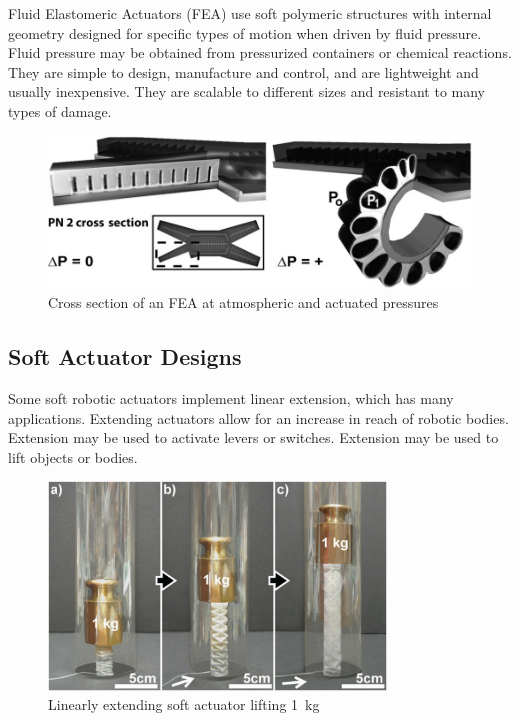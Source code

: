 Fluid Elastomeric Actuators (FEA) use soft polymeric structures with internal geometry designed for specific types of motion when driven by fluid pressure. Fluid pressure may be obtained from pressurized containers or chemical reactions. They are simple to design, manufacture and control, and are lightweight and usually inexpensive. They are scalable to different sizes and resistant to many types of damage. \cite{Shepherd2011, Onal2017}

\begin{figure}[H]
	\centering
	\includegraphics[width=1\textwidth]{FEA.png}
	\caption{Cross section of an FEA at atmospheric and actuated pressures \cite{Shepherd2011}}
	\label{fig:fea}
\end{figure}

\subsection{Soft Actuator Designs}

Some soft robotic actuators implement linear extension, which has many applications. Extending actuators allow for an increase in reach of robotic bodies. Extension may be used to activate levers or switches. Extension may be used to lift objects or bodies. \cite{Martinez2012}

\begin{figure}[H]
	\centering
	\includegraphics[width=0.8\textwidth]{LinearExtension.png}
	\caption{Linearly extending soft actuator lifting \SI{1}{kg} \cite{Martinez2012}}
	\label{fig:lea}
\end{figure}

